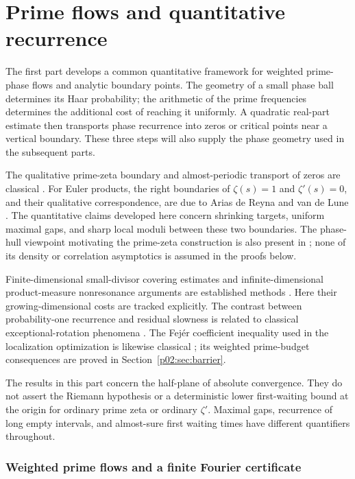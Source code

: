 \documentclass[11pt,letterpaper]{article}
\theoremstyle{definition}
\theoremstyle{remark}
\newcommand{\1}{\mathbf 1}
\begin{document}
\clearpage
\tableofcontents
\clearpage

\part{Prime flows and quantitative recurrence}
\label{part:prime-flows}

The first part develops a common quantitative framework for weighted
prime-phase flows and analytic boundary points. The geometry of a small
phase ball determines its Haar probability; the arithmetic of the prime
frequencies determines the additional cost of reaching it uniformly.
A quadratic real-part estimate then transports phase recurrence into
zeros or critical points near a vertical boundary. These three steps
will also supply the phase geometry used in the subsequent parts.

The qualitative prime-zeta boundary and almost-periodic transport of
zeros are classical \cite{SV,BCS,Farag,KR,Baroni}.
For Euler products, the right boundaries of $\zeta(s)=1$ and
$\zeta'(s)=0$, and their qualitative correspondence, are due to
Arias de Reyna and van de Lune \cite{AriasLune}. The quantitative
claims developed here concern shrinking targets, uniform maximal gaps,
and sharp local moduli between these two boundaries. The phase-hull
viewpoint motivating the prime-zeta construction is also present in
\cite{Keio004}; none of its density or correlation asymptotics is
assumed in the proofs below.

Finite-dimensional small-divisor covering estimates and
infinite-dimensional product-measure nonresonance arguments are
established methods \cite{Bounemoura,DumasFischler,Bourgain}.
Here their growing-dimensional costs are tracked explicitly. The
contrast between probability-one recurrence and residual slowness is
related to classical exceptional-rotation phenomena
\cite{GalatoloPeterlongo}. The Fej\'er coefficient inequality used in
the localization optimization is likewise classical
\cite{FejerMulti}; its weighted prime-budget consequences are proved
in Section~\ref{p02:sec:barrier}.

The results in this part concern the half-plane of absolute convergence.
They do not assert the Riemann hypothesis or a deterministic lower
first-waiting bound at the origin for ordinary prime zeta or ordinary
$\zeta'$. Maximal gaps, recurrence of long empty intervals, and
almost-sure first waiting times have different quantifiers throughout.

\section{Weighted prime flows and a finite Fourier certificate}
\label{p02:sec:foundations}
\end{document}
